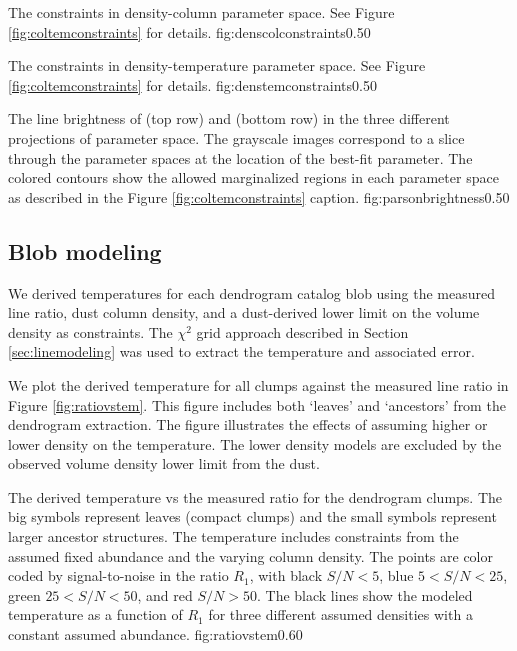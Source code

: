 {The constraints in density-column parameter space.
See Figure \ref{fig:coltemconstraints} for details.
}
{fig:denscolconstraints}{0.5}{0}

{The constraints in density-temperature parameter space.
See Figure \ref{fig:coltemconstraints} for details.}
{fig:denstemconstraints}{0.5}{0}

{The line brightness of \para \threeohthree (top row) and \para \threetwoone
(bottom row) in the three different projections of parameter space.  The
grayscale images correspond to a slice through the parameter spaces at the
location of the best-fit parameter.  The colored contours show the allowed
marginalized regions in each parameter space as described in the
Figure \ref{fig:coltemconstraints} caption.}
{fig:parsonbrightness}{0.5}{0}


\subsection{Blob modeling}
\label{sec:dendromod}
We derived temperatures for each
dendrogram catalog blob using the measured line ratio, dust column density, 
and a dust-derived lower limit on the volume density as constraints.
The $\chi^2$ grid approach described in Section \ref{sec:linemodeling} was used
to extract the temperature and associated error.

We plot the derived temperature for all clumps against the measured line ratio
in Figure \ref{fig:ratiovstem}.  This figure includes both `leaves' and `ancestors'
from the dendrogram extraction.  The figure illustrates the effects of assuming
higher or lower density on the temperature. The lower density models are
excluded by the observed volume density lower limit from the dust.

{The derived temperature vs the measured ratio \Rone for the dendrogram clumps.
The big symbols represent leaves (compact clumps) and the small symbols
represent larger ancestor structures.
The temperature includes constraints from the assumed fixed \formaldehyde
abundance and the 
varying column density.  The points are color coded by signal-to-noise in the
ratio $R_1$, with black $S/N < 5$, blue $5 < S/N < 25$, green $25 < S/N < 50$,
and red $S/N > 50$.  The black lines show the modeled temperature as a function of
$R_1$ for three different assumed densities with a constant assumed abundance.
}
{fig:ratiovstem}{0.6}{0}

